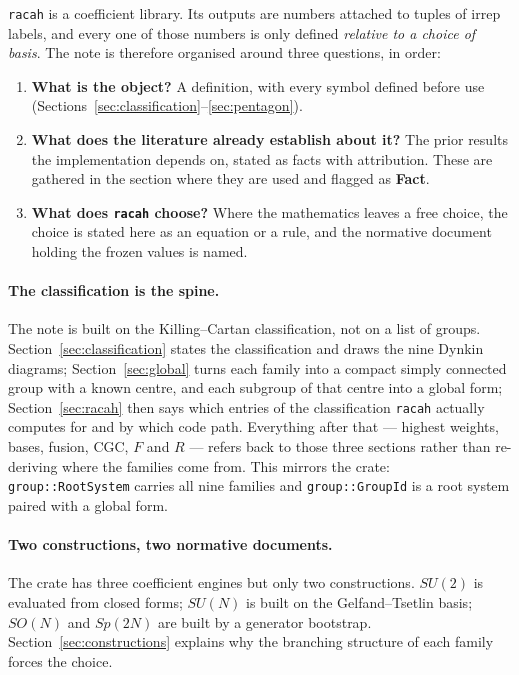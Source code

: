 \documentclass[11pt,a4paper]{article}
\theoremstyle{plain}
\theoremstyle{definition}
\newcommand{\code}[1]{\texttt{#1}}
\begin{document}
\code{racah} is a coefficient library. Its outputs are numbers attached to
tuples of irrep labels, and every one of those numbers is only defined
\emph{relative to a choice of basis}. The note is therefore organised around
three questions, in order:

\begin{enumerate}[label=(\roman*),leftmargin=2.2em]
  \item \textbf{What is the object?} A definition, with every symbol defined
    before use (Sections~\ref{sec:classification}--\ref{sec:pentagon}).
  \item \textbf{What does the literature already establish about it?} The
    prior results the implementation depends on, stated as facts with
    attribution. These are gathered in the section where they are used and
    flagged as \textbf{Fact}.
  \item \textbf{What does \code{racah} choose?} Where the mathematics leaves a
    free choice, the choice is stated here as an equation or a rule, and the
    normative document holding the frozen values is named.
\end{enumerate}

\paragraph{The classification is the spine.} The note is built on the
Killing--Cartan classification, not on a list of groups. Section~\ref{sec:classification}
states the classification and draws the nine Dynkin diagrams;
Section~\ref{sec:global} turns each family into a compact simply connected
group with a known centre, and each subgroup of that centre into a global
form; Section~\ref{sec:racah} then says which entries of the classification
\code{racah} actually computes for and by which code path. Everything after
that --- highest weights, bases, fusion, CGC, $F$ and $R$ --- refers back to
those three sections rather than re-deriving where the families come from.
This mirrors the crate: \code{group::RootSystem} carries all nine families and
\code{group::GroupId} is a root system paired with a global form.

\paragraph{Two constructions, two normative documents.} The crate has three
coefficient engines but only two constructions. $SU(2)$ is evaluated from
closed forms; $SU(N)$ is built on the Gelfand--Tsetlin basis; $SO(N)$ and
$Sp(2N)$ are built by a generator bootstrap. Section~\ref{sec:constructions}
explains why the branching structure of each family forces the choice.
\end{document}
